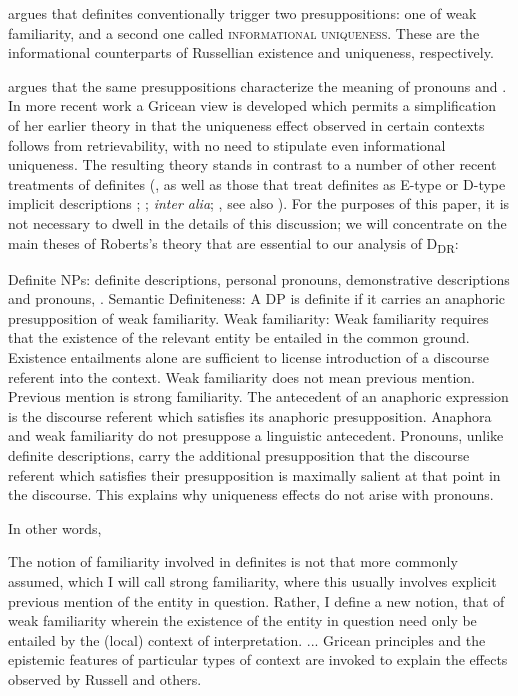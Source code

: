 \documentclass[output=paper,
modfonts
]{langscibook}
\begin{document}
\citet{Roberts2003} argues that definites conventionally trigger two presuppositions: one of weak familiarity, and a second one called \textsc{informational uniqueness}. These are the informational counterparts of Russellian existence and uniqueness, respectively. 

\citet{roberts2004} argues that the same presuppositions characterize the meaning of pronouns and  \citep{Roberts2002}. In more recent work \citep{Roberts2010b} a Gricean view is developed which permits a simplification of her earlier theory in that the uniqueness effect observed in certain contexts follows from retrievability, with no need to stipulate even informational uniqueness. The resulting theory stands in contrast to a number of other recent treatments of definites (\citealt{Neale1990}, as well as those that treat definites as E-type or D-type implicit descriptions \citealt{heim1990}; \citealt{elbourne2005}; \textit{inter alia}; \citealt{CoppockBeaver2015}, see also \citealt{fara2001}). For the purposes of this paper, it is not necessary to dwell in the details of this discussion; we will concentrate on the main theses of Roberts's theory that are essential to our analysis of D\textsubscript{DR}:

\ea\label{ex:etxeberria:23}
	\ea
		{ Definite NPs:} definite descriptions, personal pronouns, demonstrative descriptions and pronouns, .
	\ex
		{Semantic Definiteness:} A DP is definite if it carries an anaphoric presupposition of weak familiarity.
	\ex
		{Weak familiarity:}  Weak familiarity requires that the existence of the relevant entity be entailed in the common ground.  Existence entailments alone are sufficient to license introduction of a discourse referent into the context. Weak familiarity does not mean previous mention. Previous mention is strong familiarity.
	\ex
		The antecedent of an anaphoric expression is the discourse referent which satisfies its anaphoric presupposition.
	\ex
		Anaphora and weak familiarity do not presuppose a linguistic antecedent.
	\ex
		Pronouns, unlike definite descriptions, carry the additional presupposition that the discourse referent which satisfies their presupposition is maximally salient at that point in the discourse. This  explains why uniqueness effects do not arise with pronouns.
	\z
\z

In other words, 

\begin{displayquote}
The notion of familiarity involved {\ob}in definites{\cb} is not that more commonly assumed, which I will call strong familiarity, where this usually involves explicit previous mention of the entity in question. Rather, I define a new notion, that of weak familiarity wherein the existence of the entity in question need only be entailed by the (local) context of interpretation. {\ob}...{\cb} Gricean principles and the epistemic features of particular types of context are invoked to explain the  effects observed by Russell and others. \citep[288]{Roberts2003}
\end{displayquote}
\end{document}
